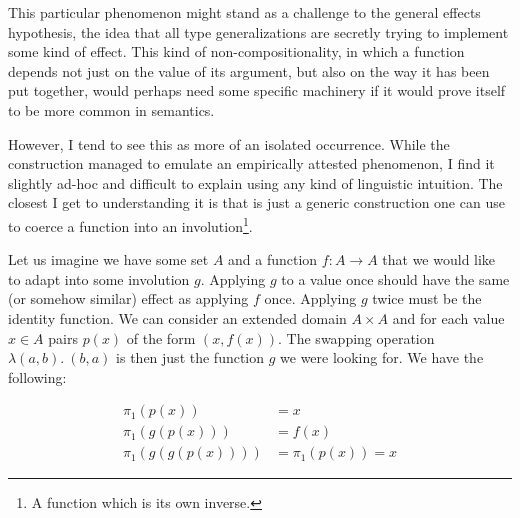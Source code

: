 \documentclass[a4paper,11pt,DIV=12]{scrartcl}
\begin{document}
This particular phenomenon might stand as a challenge to the general
effects hypothesis, the idea that all type generalizations are secretly
trying to implement some kind of effect. This kind of non-compositionality,
in which a function depends not just on the value of its argument, but also
on the way it has been put together, would perhaps need some specific
machinery if it would prove itself to be more common in semantics.

However, I tend to see this as more of an isolated occurrence. While the
construction managed to emulate an empirically attested phenomenon, I find
it slightly ad-hoc and difficult to explain using any kind of linguistic
intuition. The closest I get to understanding it is that is just a generic
construction one can use to coerce a function into an involution\footnote{A
  function which is its own inverse.}.

Let us imagine we have some set $A$ and a function $f : A \to A$ that we
would like to adapt into some involution $g$. Applying $g$ to a value once
should have the same (or somehow similar) effect as applying $f$
once. Applying $g$ twice must be the identity function. We can consider an
extended domain $A \times A$ and for each value $x \in A$ pairs $p(x)$ of
the form $(x, f(x))$. The swapping operation $\lambda (a, b).\ (b, a)$ is
then just the function $g$ we were looking for. We have the following:

\begin{align*}
\pi_1(p(x)) &= x \\
\pi_1(g(p(x))) &= f(x) \\
\pi_1(g(g(p(x)))) &= \pi_1(p(x)) = x
\end{align*}



\end{document}

